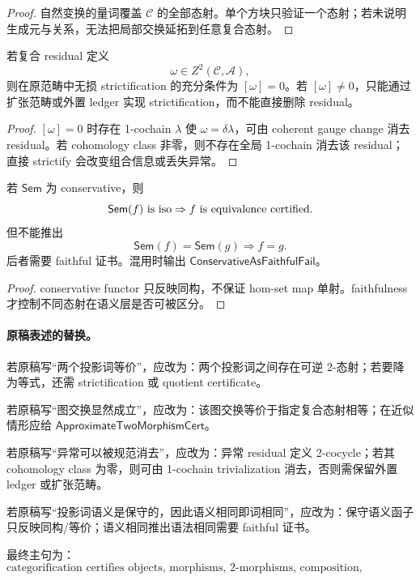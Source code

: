 \begin{proof}
自然变换的量词覆盖 \(\mathcal C\) 的全部态射。单个方块只验证一个态射；若未说明生成元与关系，无法把局部交换延拓到任意复合态射。
\end{proof}

\begin{theorem}\label{thm:typed-address-biaxial-completion-anomaly-strictification}
若复合 residual 定义
\[
\omega\in Z^2(\mathcal C,\mathcal A),
\]
则在原范畴中无损 strictification 的充分条件为 \([\omega]=0\)。若 \([\omega]\ne0\)，只能通过扩张范畴或外置 ledger 实现 strictification，而不能直接删除 residual。
\end{theorem}

\begin{proof}
\([\omega]=0\) 时存在 1-cochain \(\lambda\) 使 \(\omega=\delta\lambda\)，可由 coherent gauge change 消去 residual。若 cohomology class 非零，则不存在全局 1-cochain 消去该 residual；直接 strictify 会改变组合信息或丢失异常。
\end{proof}

\begin{theorem}[保守语义只反映等价]\label{thm:typed-address-biaxial-completion-conservative-semantics}
若 \(\mathsf{Sem}\) 为 conservative，则
\[
\mathsf{Sem}(f)\ {\rm is\ iso}
\Rightarrow
f\ {\rm is\ equivalence\ certified}.
\]
但不能推出
\[
\mathsf{Sem}(f)=\mathsf{Sem}(g)\Rightarrow f=g.
\]
后者需要 faithful 证书。混用时输出 \(\mathsf{ConservativeAsFaithfulFail}\)。
\end{theorem}

\begin{proof}
conservative functor 只反映同构，不保证 hom-set map 单射。faithfulness 才控制不同态射在语义层是否可被区分。
\end{proof}

\paragraph{原稿表述的替换。}
若原稿写“两个投影词等价”，应改为：两个投影词之间存在可逆 2-态射；若要降为等式，还需 strictification 或 quotient certificate。

若原稿写“图交换显然成立”，应改为：该图交换等价于指定复合态射相等；在近似情形应给 \(\mathsf{ApproximateTwoMorphismCert}\)。

若原稿写“异常可以被规范消去”，应改为：异常 residual 定义 2-cocycle；若其 cohomology class 为零，则可由 1-cochain trivialization 消去，否则需保留外置 ledger 或扩张范畴。

若原稿写“投影词语义是保守的，因此语义相同即词相同”，应改为：保守语义函子只反映同构/等价；语义相同推出语法相同需要 faithful 证书。

最终主句为：
\[
\boxed{
\text{categorification certifies objects, morphisms, 2-morphisms, composition, naturality, anomaly, cost, and semantic preservation; it is not merely drawing arrows.}
}
\]
